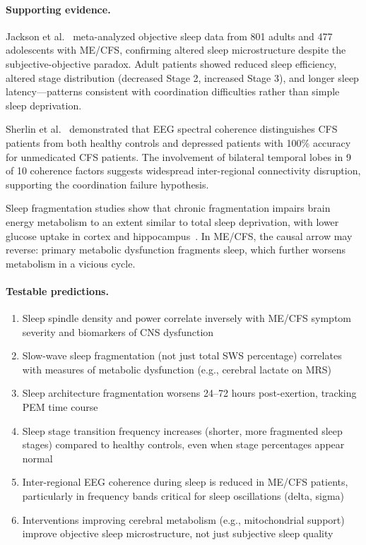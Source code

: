 \begin{hypothesis}
\paragraph{Supporting evidence.}
Jackson et al.~\cite{Jackson2023sleep} meta-analyzed objective sleep data from 801 adults and 477 adolescents with ME/CFS, confirming altered sleep microstructure despite the subjective-objective paradox. Adult patients showed reduced sleep efficiency, altered stage distribution (decreased Stage 2, increased Stage 3), and longer sleep latency---patterns consistent with coordination difficulties rather than simple sleep deprivation.

Sherlin et al.~\cite{Sherlin2011coherence} demonstrated that EEG spectral coherence distinguishes CFS patients from both healthy controls and depressed patients with 100\% accuracy for unmedicated CFS patients. The involvement of bilateral temporal lobes in 9 of 10 coherence factors suggests widespread inter-regional connectivity disruption, supporting the coordination failure hypothesis.

Sleep fragmentation studies show that chronic fragmentation impairs brain energy metabolism to an extent similar to total sleep deprivation, with lower glucose uptake in cortex and hippocampus~\cite{Baud2016fragmentation}. In ME/CFS, the causal arrow may reverse: primary metabolic dysfunction fragments sleep, which further worsens metabolism in a vicious cycle.

\paragraph{Testable predictions.}
\begin{enumerate}
    \item Sleep spindle density and power correlate inversely with ME/CFS symptom severity and biomarkers of CNS dysfunction
    \item Slow-wave sleep fragmentation (not just total SWS percentage) correlates with measures of metabolic dysfunction (e.g., cerebral lactate on MRS)
    \item Sleep architecture fragmentation worsens 24--72 hours post-exertion, tracking PEM time course
    \item Sleep stage transition frequency increases (shorter, more fragmented sleep stages) compared to healthy controls, even when stage percentages appear normal
    \item Inter-regional EEG coherence during sleep is reduced in ME/CFS patients, particularly in frequency bands critical for sleep oscillations (delta, sigma)
    \item Interventions improving cerebral metabolism (e.g., mitochondrial support) improve objective sleep microstructure, not just subjective sleep quality
\end{enumerate}


\end{hypothesis}
